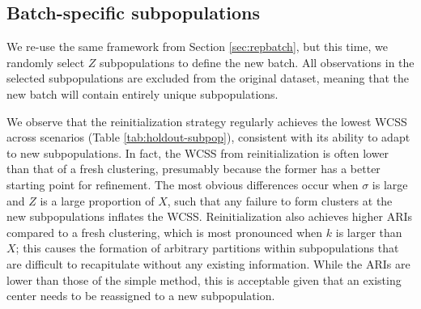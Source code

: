 \documentclass{article}
\begin{document}
\subsection{Batch-specific subpopulations}

We re-use the same framework from Section \ref{sec:repbatch}, but this time, we randomly select $Z$ subpopulations to define the new batch.
All observations in the selected subpopulations are excluded from the original dataset, meaning that the new batch will contain entirely unique subpopulations.

We observe that the reinitialization strategy regularly achieves the lowest WCSS across scenarios (Table \ref{tab:holdout-subpop}), consistent with its ability to adapt to new subpopulations.
In fact, the WCSS from reinitialization is often lower than that of a fresh clustering, presumably because the former has a better starting point for refinement.
The most obvious differences occur when $\sigma$ is large and $Z$ is a large proportion of $X$, such that any failure to form clusters at the new subpopulations inflates the WCSS.
Reinitialization also achieves higher ARIs compared to a fresh clustering, which is most pronounced when $k$ is larger than $X$;
this causes the formation of arbitrary partitions within subpopulations that are difficult to recapitulate without any existing information.
While the ARIs are lower than those of the simple method, this is acceptable given that an existing center needs to be reassigned to a new subpopulation.
\end{document}
